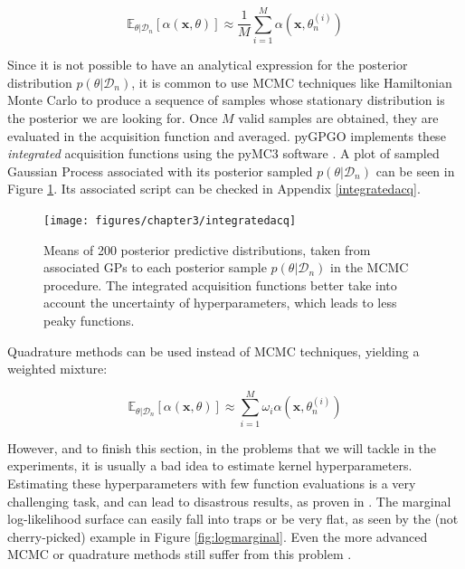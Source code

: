 \documentclass[10pt,a4paper,twoside]{book}
\begin{document}
\begin{equation}
\mathbb{E}_{\theta|\mathcal{D}_n}\left[ \alpha(\boldsymbol{x},\theta )\right] \approx \dfrac{1}{M} \sum_{i=1}^M \alpha(\boldsymbol{x},\theta_n^{(i)})
\end{equation}

Since it is not possible to have an analytical expression for the posterior distribution $p(\theta|\mathcal{D}_n)$, it is common to use MCMC techniques like Hamiltonian Monte Carlo \cite{Neal2011} to produce a sequence of samples whose stationary distribution is the posterior we are looking for. Once $M$ valid samples are obtained, they are evaluated in the acquisition function and averaged. pyGPGO implements these \textit{integrated} acquisition functions using the pyMC3 software \cite{Coyle2015}. A plot of sampled Gaussian Process associated with its posterior sampled $p(\theta|\mathcal{D}_n)$ can be seen in Figure  \ref{fig:integratedacq}. Its associated script can be checked in Appendix \ref{integratedacq}.

\begin{figure}
\centering
\caption{Means of 200 posterior predictive distributions, taken from associated GPs to each posterior sample $p(\theta|\mathcal{D}_n)$ in the MCMC procedure. The integrated acquisition functions better take into account the uncertainty of hyperparameters, which leads to less peaky functions.}
\texttt{[image: figures/chapter3/integratedacq]}
\label{fig:integratedacq}
\end{figure}


Quadrature methods can be used instead of MCMC techniques, yielding a weighted mixture:

\begin{equation}
\mathbb{E}_{\theta|\mathcal{D}_n}\left[ \alpha(\boldsymbol{x},\theta )\right] \approx \sum_{i=1}^M \omega_i \alpha(\boldsymbol{x},\theta_n^{(i)})
\end{equation}

However, and to finish this section, in the problems that we will tackle in the experiments, it is usually a bad idea to estimate kernel hyperparameters. Estimating these hyperparameters with few function evaluations is a very challenging task, and can lead to disastrous results, as proven in \cite{Benassi2011, Bull2011}. The marginal log-likelihood surface can easily fall into traps or be very flat, as seen by the (not cherry-picked) example in Figure \ref{fig:logmarginal}. Even the more advanced MCMC or quadrature methods still suffer from this problem \cite{Wang2014}.
\end{document}
